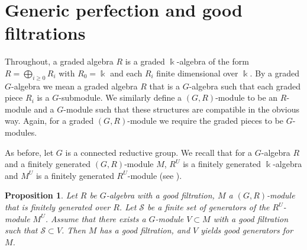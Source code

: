 \documentclass[11pt]{amsart}
\numberwithin{equation}{section}
\newtheorem{proposition}[equation]{Proposition}
\newtheorem{lemma}[equation]{Lemma}
\theoremstyle{definition}
\newcommand{\oo}{\otimes}
\newcommand{\mc}{\mathcal}
\newcommand{\gfd}{\operatorname{gfd}}
\newcommand{\kk}{\Bbbk}
\newcommand{\blue}[1]{\textcolor{blue}{#1}}
\begin{document}


\section{Generic perfection and good filtrations}

Throughout, a graded algebra $R$ is a graded $\kk$-algebra of the form $R=\bigoplus_{i\geq 0}  R_i$ with $R_0 = \kk$ and each $R_i$ finite dimensional over $\kk$. By a graded $G$-algebra we mean a graded algebra $R$ that is a $G$-algebra such that each graded piece $R_i$ is a $G$-submodule. We similarly define a $(G,R)$-module to be an $R$-module and a $G$-module such that these structures are compatible in the obvious way. Again, for a graded $(G,R)$-module we require the graded pieces to be $G$-modules.

\smallskip

As before, let $G$ is a connected reductive group. 
We recall that for a $G$-algebra $R$ and a finitely generated $(G,R)$-module $M$,  $R^U$ is a finitely generated $\kk$-algebra and $M^U$ is a finitely generated $R^U$-module (see  \cite[Theorems 9.4 and 16.8]{grossbook}).


\begin{proposition}\label{prop:goodgen}
Let $R$ be $G$-algebra with a good filtration, $M$ a $(G,R)$-module that is finitely generated over $R$. Let $\mc{S}$ be a finite set of generators of the $R^U$-module $M^U$. Assume that there exists a $G$-module $V \subset M$ with a good filtration such that $\mc{S} \subset V$. Then $M$ has a good filtration, and $V$ yields good generators for $M$.
\end{proposition}
\end{document}
